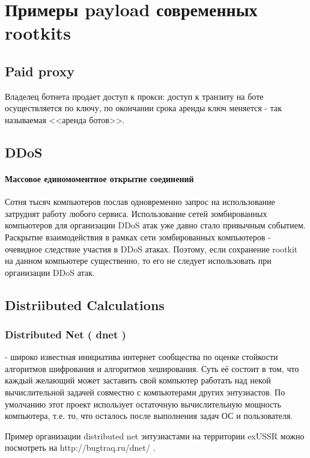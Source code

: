 \section{Примеры payload современных rootkits}
\label{section_rk_payloads}

\subsection{Paid proxy}
Владелец ботнета продает доступ к прокси: доступ к транзиту на боте осуществляется по ключу,
по окончании срока аренды ключ меняется - так называемая <<аренда ботов>>.

\subsection{DDoS}

\paragraph{Массовое единомоментное открытие соединений\\}
Сотня тысяч компьютеров послав одновременно запрос на использование
затруднят работу любого сервиса. Использование сетей зомбированных
компьютеров для организации DDoS атак уже давно стало привычным
событием.\\
Раскрытие взаимодействия в рамках сети зомбированных компьютеров - очевидное
следствие участия в DDoS атаках. Поэтому, если сохранение rootkit на
данном компьютере существенно, то его не следует использовать при
организации DDoS атак.

\subsection{Distriibuted Calculations}

\subsubsection{Distributed Net ( dnet ) }\label{dnet} - широко известная
 инициатива  интернет сообщества по оценке стойкости алгоритмов шифрования и
алгоритмов хеширования. Суть её состоит в том, что каждый желающий
может заставить свой компьютер работать над некой вычислительной задачей
совместно с компьютерами других энтузиастов. По умолчанию этот проект
использует остаточную вычислительную мощность компьютера, т.е. то, что
осталось после выполнения задач ОС и пользователя.

Пример организации distributed net энтузиастами на территории exUSSR
можно посмотреть на http://bugtraq.ru/dnet/ .


